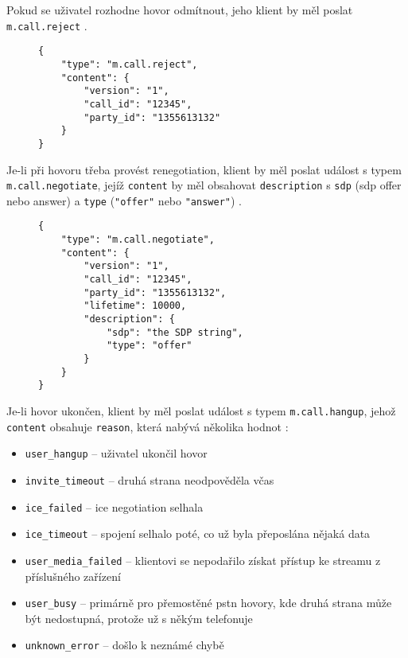 Pokud se uživatel rozhodne hovor odmítnout, jeho klient by měl poslat
\texttt{m.call.reject} \parencite{GitHub-MSC2746}.

\begin{figure}[H]
    \begin{verbatim}
{
	"type": "m.call.reject",
	"content": {
		"version": "1",
		"call_id": "12345",
		"party_id": "1355613132"
	}
}
	\end{verbatim}
\end{figure}

Je-li při hovoru třeba provést renegotiation, klient by měl poslat událost s
typem \texttt{m.call.negotiate}, jejíž \texttt{content} by
měl obsahovat \texttt{description} s \texttt{sdp} (\gls{sdp}
offer nebo answer) a \texttt{type} (\texttt{"offer"} nebo
\texttt{"answer"}) \parencite{GitHub-MSC2746}.

\begin{figure}[H]
    \begin{verbatim}
{
	"type": "m.call.negotiate",
	"content": {
		"version": "1",
		"call_id": "12345",
		"party_id": "1355613132",
		"lifetime": 10000,
		"description": {
			"sdp": "the SDP string",
			"type": "offer"
		}
	}
}
	\end{verbatim}
\end{figure}

Je-li hovor ukončen, klient by měl poslat událost s typem
\texttt{m.call.hangup}, jehož \texttt{content} obsahuje
\texttt{reason}, která nabývá několika hodnot
\parencite{GitHub-MSC2746}:
\begin{itemize}
    \itemsep0em
    \item \texttt{user_hangup} -- uživatel ukončil hovor
    \item \texttt{invite_timeout} -- druhá strana neodpověděla včas
    \item \texttt{ice_failed} -- \gls{ice} negotiation selhala
    \item \texttt{ice_timeout} -- spojení selhalo poté, co už byla
          přeposlána nějaká data
    \item \texttt{user_media_failed} -- klientovi se nepodařilo získat
          přístup ke streamu z příslušného zařízení
    \item \texttt{user_busy} -- primárně pro přemostěné
          \gls{pstn} hovory, kde druhá strana může být nedostupná, protože už s
          někým telefonuje
    \item \texttt{unknown_error} -- došlo k neznámé chybě
\end{itemize}

